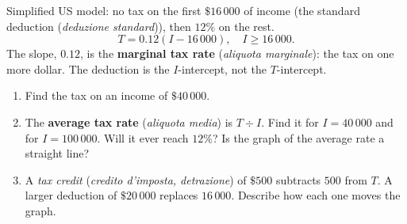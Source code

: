 \documentclass[12pt, twoside]{article}
\newcommand{\ita}[1]{(\emph{#1})}
\begin{document}
\begin{minipage}[t]{0.5\linewidth}
Simplified US model: no tax on the first $\$16\,000$ of income (the
standard deduction \ita{deduzione standard}), then $12\%$ on the rest.
\[
  T = 0.12(I - 16\,000), \quad I \ge 16\,000.
\]
The slope, $0.12$, is the \textbf{marginal tax rate} \ita{aliquota
marginale}: the tax on one more dollar. The deduction is the
$I$-intercept, not the $T$-intercept.
\end{minipage}
\hfill
\begin{minipage}[t]{0.46\linewidth}
\vspace{0pt}
\end{minipage}

\begin{enumerate}[label=(\alph*), itemsep=0.1cm]
  \item Find the tax on an income of $\$40\,000$.
  \vspace{1.1cm}
  \item The \textbf{average tax rate} \ita{aliquota media} is $T \div I$.
  Find it for $I = 40\,000$ and for $I = 100\,000$. Will it ever reach
  $12\%$? Is the graph of the average rate a straight line?
  \vspace{1.8cm}
  \item A \emph{tax credit} \ita{credito d'imposta, detrazione} of $\$500$
  subtracts $500$ from $T$. A larger deduction of $\$20\,000$ replaces
  $16\,000$. Describe how each one moves the graph.
  \vspace{1.6cm}
\end{enumerate}
\end{document}
